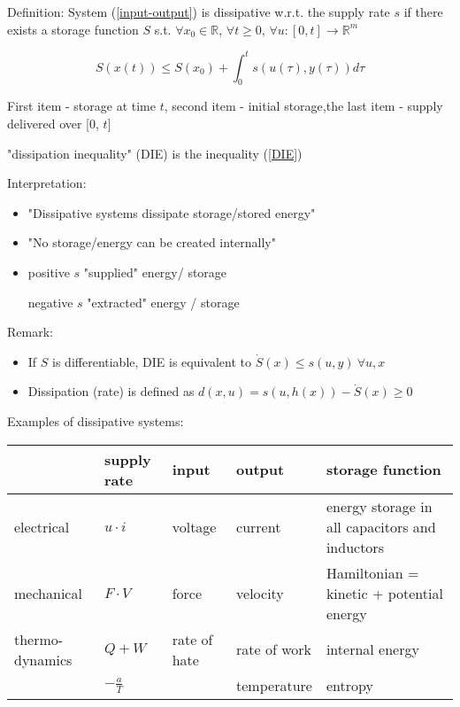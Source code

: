Definition: System (\ref{input-output}) is dissipative w.r.t. the supply rate $s$ if there exists a storage function $S$ s.t. $\forall x_0 \in \mathbb{R}$, $\forall t \geq 0$, $\forall u : [0, t] \to \mathbb{R}^m$

\begin{equation}\label{DIE}
S(x(t)) \leq S(x_0)
 + \int_0^ts(u(\tau), y(\tau))d\tau
\end{equation}  

First item - storage at time $t$, second item - initial storage,the last item - supply delivered over [0, $t$]

"dissipation inequality" (DIE) is the inequality (\ref{DIE})

Interpretation:
\begin{itemize}
\item "Dissipative systems dissipate storage/stored energy"
\item "No storage/energy can be created internally"
\item positive $s$ "supplied" energy/ storage
     
      negative $s$ "extracted" energy / storage
\end{itemize}

Remark: 
\begin{itemize}
\item If $S$ is differentiable, DIE is equivalent to $\dot{S}(x) \leq s(u,y) \ \forall u, x$
\item Dissipation (rate) is defined as $d(x,u) = s(u,h(x)) - \dot{S}(x) \geq 0$
\end{itemize}

Examples of dissipative systems:
\begin{center}
    \begin{tabular}{| l | l | l | l | l |}
    \hline
     & supply rate & input & output & storage function  \\ \hline
    electrical & $u \cdot i$ & voltage & current & energy storage in all capacitors and inductors\\ \hline
    mechanical & $F \cdot V$ & force & velocity & Hamiltonian = kinetic + potential energy \\ \hline
    thermo-dynamics & $Q + W$ & rate of hate & rate of work & internal energy \\
    \hline
    & $-\frac{a}{T}$ & & temperature & entropy \\
    \hline
    \end{tabular}
\end{center}

